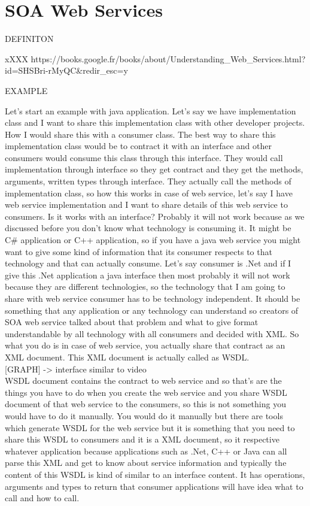 \section{SOA Web Services}
\label{section:soa}
DEFINITON

xXXX
https://books.google.fr/books/about/Understanding_Web_Services.html?id=SHSBri-rMyQC&redir_esc=y

EXAMPLE

Let’s start an example with java application. Let’s say we have implementation class and I want to share this implementation
class with other developer projects. How I would share this with a consumer class. The best way to share this implementation
class would be to contract it with an interface and other consumers would consume this class through this interface.
They would call implementation through interface so they get contract and they get the methods, arguments, written types
through interface. They actually call the methods of implementation class, so how this works in case of web service, let’s
say I have web service implementation and I want to share details of this web service to consumers. Is it works with an
interface? Probably it will not work because as we discussed before you don’t know what technology is consuming it. It might
be C# application or C++ application, so if you have a java web service you might want to give some kind of information that
its consumer respects to that technology and that can actually consume. Let’s say consumer is .Net and if I give this .Net
application a java interface then most probably it will not work because they are different technologies, so the technology
that I am going to share with web service consumer has to be technology independent. It should be something that any
application or any technology can understand so creators of SOA web service talked about that problem and what to give format
understandable by all technology with all consumers and decided with XML. So what you do is in case of web service, you
actually share that contract as an XML document. This XML document is actually called as WSDL.\\

[GRAPH]  -> interface similar to video\\

WSDL document contains the contract to web service and so that’s are the things you have to do when you create the web
service and you share WSDL document of that web service to the consumers, so this is not something you would have to do
it manually. You would do it manually but there are tools which generate WSDL for the web service but it is something that
you need to share this WSDL to consumers and it is a XML document, so it respective whatever application because applications
such as .Net, C++ or Java can all parse this XML and get to know about service information and typically the content of
this WSDL is kind of similar to an interface content. It has operations, arguments and types  to return that consumer
applications will have idea what to call and how to call.\\

